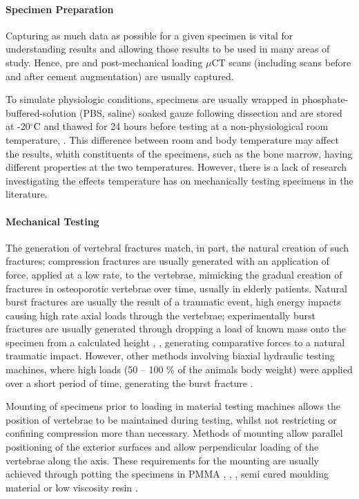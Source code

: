 \paragraph{Specimen Preparation }\label{specimen-preparation}

Capturing as much data as possible for a given specimen is vital for understanding
results and allowing those results to be used in many areas of study.
Hence, pre and post-mechanical loading $\mu$CT scans (including
scans before and after cement augmentation) are usually captured.

To simulate physiologic conditions, specimens are usually wrapped in
phosphate-buffered-solution (PBS, saline) soaked gauze following
dissection \cite{belkoff2002ex} and are stored at -20$^\circ$C and
thawed for 24
hours
before testing at a non-physiological room temperature\cite{tarsuslugil2013development},
\cite{furtado2007biomechanical}. This difference between room and body temperature may affect the results, whith constituents of the specimens, such as the bone marrow, having different properties at the two temperatures. However, there is a lack of research investigating the effects temperature has on mechanically testing specimens in the literature.
\paragraph{Mechanical Testing }\label{mechanical-testing}

The generation of vertebral fractures match, in part, the natural
creation of such fractures; compression fractures are usually generated
with an application of force, applied at a low rate, to the vertebrae,
mimicking the gradual creation of fractures in osteoporotic vertebrae
over time, usually in elderly patients. Natural burst fractures are
usually the result of a traumatic event, high energy impacts causing high
rate axial loads through the vertebrae; experimentally burst fractures
are usually generated through dropping a load of known mass onto the
specimen from a calculated height \cite{tarsuslugil2013development},
\cite{wilcox2004dynamic},
generating
comparative forces to a natural traumatic impact. However, other methods
involving biaxial hydraulic testing machines, where high loads (50 --
100 \% of the animals body weight) were applied over a short period of
time, generating the burst fracture \cite{Gurwitz1993}.

Mounting of specimens prior to loading in material testing machines
allows the position of vertebrae to be maintained during testing, whilst
not restricting or confining compression more than necessary. Methods of
mounting allow parallel positioning of the exterior surfaces and allow
perpendicular loading of the vertebrae along the axis. These
requirements for the mounting are usually achieved through potting the
specimens in PMMA \cite{tarsuslugil2013development},
\cite{furtado2007biomechanical}, \cite{ananthakrishnan2005effect}, semi
cured moulding
material \cite{berlemann2002adjacent} or low viscosity resin
\cite{pneumaticos2013effect}.

